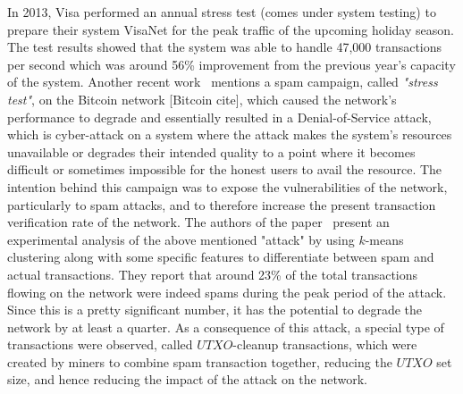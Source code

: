 In 2013, Visa performed an annual stress test (comes under system testing) to prepare their system VisaNet for the peak traffic of the upcoming holiday season. The test results showed that the system was able to handle 47,000 transactions per second which was around 56\% improvement from the previous year's capacity of the system. %
Another recent work~\cite{baqer2016stressing} mentions a spam campaign, called \textit{"stress test"}, on the Bitcoin network [Bitcoin cite], which caused the network's performance to degrade and essentially resulted in a Denial-of-Service attack, which is cyber-attack on a system where the attack makes the system's resources unavailable or degrades their intended quality to a point where it becomes difficult or sometimes impossible for the honest users to avail the resource. The intention behind this campaign was to expose the vulnerabilities of the network, particularly to spam attacks, and to therefore increase the present transaction verification rate of the network. The authors of the paper~\cite{baqer2016stressing} present an experimental analysis of the above mentioned "attack" by using $k$-means clustering along with some specific features to differentiate between spam and actual transactions. They report that around 23\% of the total transactions flowing on the network were indeed spams during the peak period of the attack. Since this is a pretty significant number, it has the potential to degrade the network by at least a quarter. As a consequence of this attack, a special type of transactions were observed, called $UTXO$-cleanup transactions, which were created by miners to combine spam transaction together, reducing the $UTXO$ set size, and hence reducing the impact of the attack on the network. 


